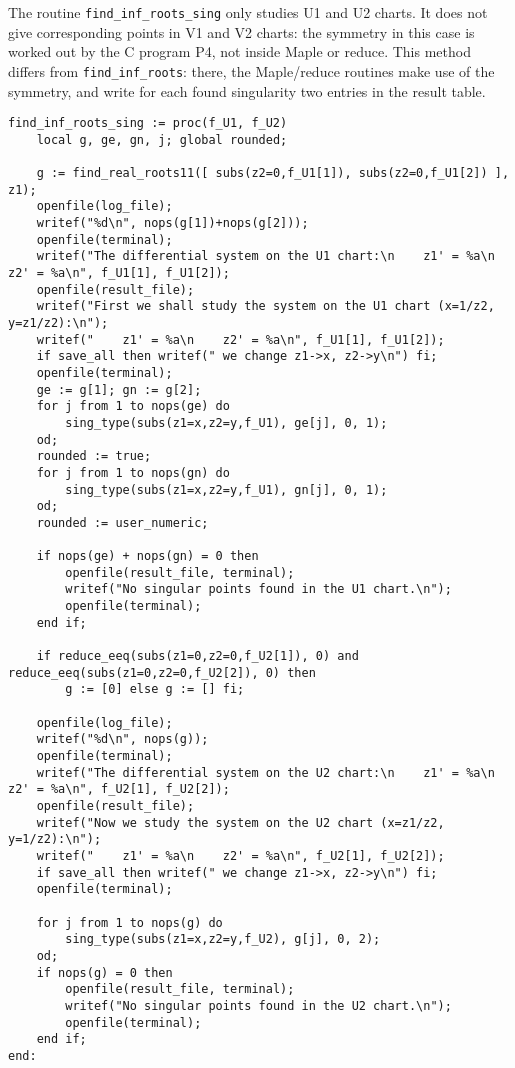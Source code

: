 \documentclass[a4paper,10pt]{article}
\begin{document}
The routine \verb+find_inf_roots_sing+ only studies U1 and U2
charts. It does not give corresponding points in V1 and V2 charts:
the symmetry in this case is worked out by the C program P4, not
inside Maple or reduce. This method differs from
\verb+find_inf_roots+: there, the Maple/reduce routines make use
of the symmetry, and write for each found singularity two entries
in the result table.

\begin{lstlisting}[name=infinity]
find_inf_roots_sing := proc(f_U1, f_U2)
    local g, ge, gn, j; global rounded;

    g := find_real_roots11([ subs(z2=0,f_U1[1]), subs(z2=0,f_U1[2]) ], z1);
    openfile(log_file);
    writef("%d\n", nops(g[1])+nops(g[2]));
    openfile(terminal);
    writef("The differential system on the U1 chart:\n    z1' = %a\n    z2' = %a\n", f_U1[1], f_U1[2]);
    openfile(result_file);
    writef("First we shall study the system on the U1 chart (x=1/z2, y=z1/z2):\n");
    writef("    z1' = %a\n    z2' = %a\n", f_U1[1], f_U1[2]);
    if save_all then writef(" we change z1->x, z2->y\n") fi;
    openfile(terminal);
    ge := g[1]; gn := g[2];
    for j from 1 to nops(ge) do
        sing_type(subs(z1=x,z2=y,f_U1), ge[j], 0, 1);
    od;
    rounded := true;
    for j from 1 to nops(gn) do
        sing_type(subs(z1=x,z2=y,f_U1), gn[j], 0, 1);
    od;
    rounded := user_numeric;

    if nops(ge) + nops(gn) = 0 then
        openfile(result_file, terminal);
        writef("No singular points found in the U1 chart.\n");
        openfile(terminal);
    end if;

    if reduce_eeq(subs(z1=0,z2=0,f_U2[1]), 0) and reduce_eeq(subs(z1=0,z2=0,f_U2[2]), 0) then
        g := [0] else g := [] fi;

    openfile(log_file);
    writef("%d\n", nops(g));
    openfile(terminal);
    writef("The differential system on the U2 chart:\n    z1' = %a\n    z2' = %a\n", f_U2[1], f_U2[2]);
    openfile(result_file);
    writef("Now we study the system on the U2 chart (x=z1/z2, y=1/z2):\n");
    writef("    z1' = %a\n    z2' = %a\n", f_U2[1], f_U2[2]);
    if save_all then writef(" we change z1->x, z2->y\n") fi;
    openfile(terminal);

    for j from 1 to nops(g) do
        sing_type(subs(z1=x,z2=y,f_U2), g[j], 0, 2);
    od;
    if nops(g) = 0 then
        openfile(result_file, terminal);
        writef("No singular points found in the U2 chart.\n");
        openfile(terminal);
    end if;
end:
\end{lstlisting}
\end{document}
